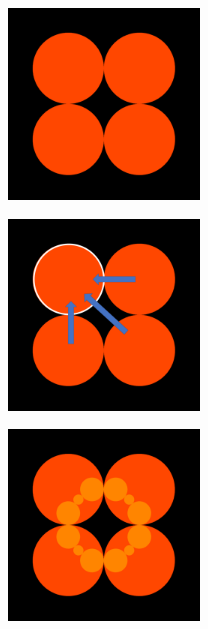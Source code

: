\begin{figure}[htbp]
 \begin{minipage}{0.33\hsize}
  \begin{center}
   \includegraphics[width=2in, height=2in, keepaspectratio]{../img/klein/orbit/level0.pdf}
   \label{fig:level0}
  \end{center}
 \end{minipage}
 \begin{minipage}{0.33\hsize}
  \begin{center}
   \includegraphics[width=2in, height=2in, keepaspectratio]{../img/klein/orbit/level0inv.pdf}
   \label{fig:level0inv}
  \end{center}
 \end{minipage}
 \begin{minipage}{0.33\hsize}
  \begin{center}
   \includegraphics[width=2in, height=2in, keepaspectratio]{../img/klein/orbit/level1.pdf}
   \label{fig:level1}

\end{center}
\end{minipage}
\end{figure}
